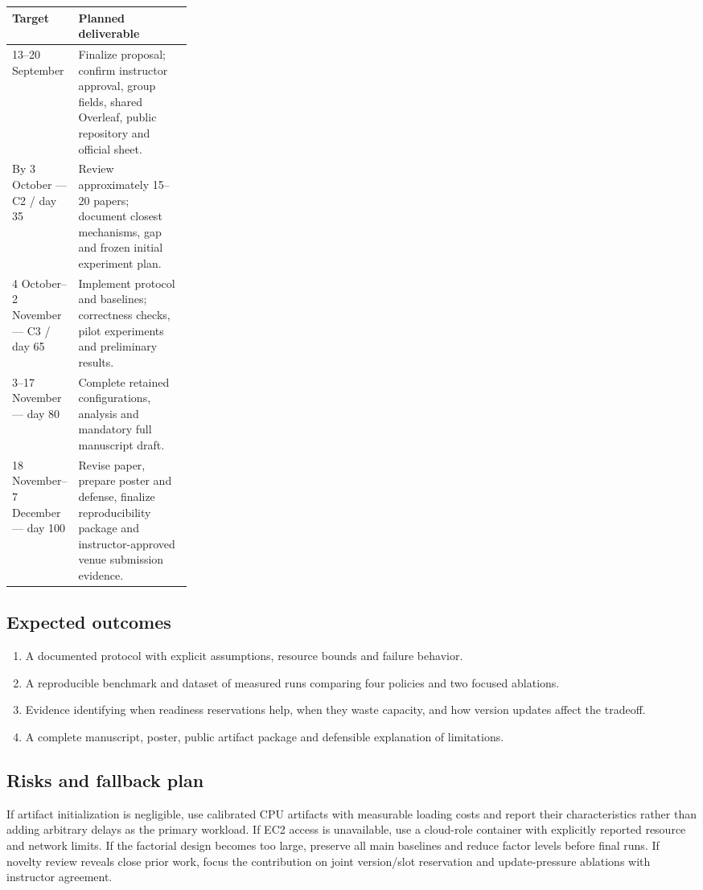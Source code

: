 \documentclass[11pt,a4paper]{article}
\begin{document}
\begin{center}
\small
\begin{tabularx}{\linewidth}{|p{0.26\linewidth}|X|}
\hline
\textbf{Target} & \textbf{Planned deliverable} \\ \hline
13--20 September & Finalize proposal; confirm instructor approval, group fields, shared Overleaf, public repository and official sheet. \\ \hline
By 3 October --- C2 / day 35 & Review approximately 15--20 papers; document closest mechanisms, gap and frozen initial experiment plan. \\ \hline
4 October--2 November --- C3 / day 65 & Implement protocol and baselines; correctness checks, pilot experiments and preliminary results. \\ \hline
3--17 November --- day 80 & Complete retained configurations, analysis and mandatory full manuscript draft. \\ \hline
18 November--7 December --- day 100 & Revise paper, prepare poster and defense, finalize reproducibility package and instructor-approved venue submission evidence. \\ \hline
\end{tabularx}
\end{center}

\subsection{Expected outcomes}

\begin{enumerate}
\item A documented protocol with explicit assumptions, resource bounds and failure behavior.
\item A reproducible benchmark and dataset of measured runs comparing four policies and two focused ablations.
\item Evidence identifying when readiness reservations help, when they waste capacity, and how version updates affect the tradeoff.
\item A complete manuscript, poster, public artifact package and defensible explanation of limitations.
\end{enumerate}

\subsection{Risks and fallback plan}

If artifact initialization is negligible, use calibrated CPU artifacts with measurable loading costs and report their characteristics rather than adding arbitrary delays as the primary workload. If EC2 access is unavailable, use a cloud-role container with explicitly reported resource and network limits. If the factorial design becomes too large, preserve all main baselines and reduce factor levels before final runs. If novelty review reveals close prior work, focus the contribution on joint version/slot reservation and update-pressure ablations with instructor agreement.
\end{document}
